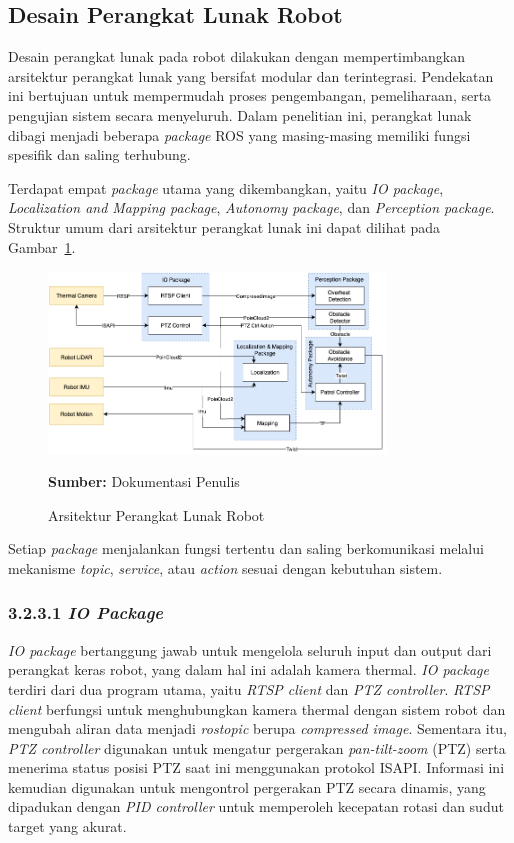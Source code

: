 \subsection{Desain Perangkat Lunak Robot}
Desain perangkat lunak pada robot dilakukan dengan mempertimbangkan arsitektur perangkat lunak yang bersifat modular dan terintegrasi. Pendekatan ini bertujuan untuk mempermudah proses pengembangan, pemeliharaan, serta pengujian sistem secara menyeluruh. Dalam penelitian ini, perangkat lunak dibagi menjadi beberapa \textit{package} ROS yang masing-masing memiliki fungsi spesifik dan saling terhubung.

Terdapat empat \textit{package} utama yang dikembangkan, yaitu \textit{IO package}, \textit{Localization and Mapping package}, \textit{Autonomy package}, dan \textit{Perception package}. Struktur umum dari arsitektur perangkat lunak ini dapat dilihat pada Gambar~\ref{fig:software-arch}.

\begin{figure}[H]
  \centering
  \includegraphics[width=0.8\textwidth]{gambar/bab3/sotware-arch.png}
  \caption{Arsitektur Perangkat Lunak Robot}
  \label{fig:software-arch}
  \footnotesize{\textbf{Sumber:} Dokumentasi Penulis}
\end{figure}

Setiap \textit{package} menjalankan fungsi tertentu dan saling berkomunikasi melalui mekanisme \textit{topic}, \textit{service}, atau \textit{action} sesuai dengan kebutuhan sistem.

\subsubsection{3.2.3.1 \emph{IO Package}}
\textit{IO package} bertanggung jawab untuk mengelola seluruh input dan output dari perangkat keras robot, yang dalam hal ini adalah kamera thermal. \textit{IO package} terdiri dari dua program utama, yaitu \textit{RTSP client} dan \textit{PTZ controller}.  \textit{RTSP client} berfungsi untuk menghubungkan kamera thermal dengan sistem robot dan mengubah aliran data menjadi \textit{rostopic} berupa \textit{compressed image}. Sementara itu, \textit{PTZ controller} digunakan untuk mengatur pergerakan \textit{pan-tilt-zoom} (PTZ) serta menerima status posisi PTZ saat ini menggunakan protokol ISAPI. Informasi ini kemudian digunakan untuk mengontrol pergerakan PTZ secara dinamis, yang dipadukan dengan \textit{PID controller} untuk memperoleh kecepatan rotasi dan sudut target yang akurat.

